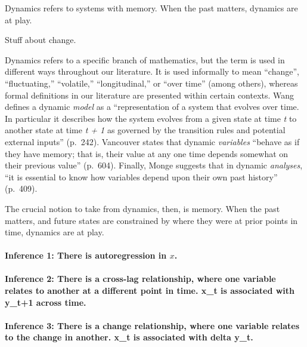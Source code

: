 \documentclass[english,,man]{apa6}
\let\oldparagraph\paragraph
\renewcommand{\paragraph}[1]{\oldparagraph{#1}\mbox{}}
\theoremstyle{definition}
\theoremstyle{definition}
\theoremstyle{definition}
\theoremstyle{remark}
\begin{document}
Dynamics refers to systems with memory. When the past matters, dynamics
are at play.

Stuff about change.

Dynamics refers to a specific branch of mathematics, but the term is
used in different ways throughout our literature. It is used informally
to mean \enquote{change}, \enquote{fluctuating,} \enquote{volatile,}
\enquote{longitudinal,} or \enquote{over time} (among others), whereas
formal definitions in our literature are presented within certain
contexts. Wang defines a dynamic \emph{model} as a
\enquote{representation of a system that evolves over time. In
particular it describes how the system evolves from a given state at
time \emph{t} to another state at time \emph{t + 1} as governed by the
transition rules and potential external inputs} (p.~242). Vancouver
states that dynamic \emph{variables} \enquote{behave as if they have
memory; that is, their value at any one time depends somewhat on their
previous value} (p.~604). Finally, Monge suggests that in dynamic
\emph{analyses}, \enquote{it is essential to know how variables depend
upon their own past history} (p.~409).

The crucial notion to take from dynamics, then, is memory. When the past
matters, and future states are constrained by where they were at prior
points in time, dynamics are at play.

\hypertarget{inference-1-there-is-autoregression-in-x.}{%
\paragraph{\texorpdfstring{Inference 1: There is autoregression in
\(x\).}{Inference 1: There is autoregression in x.}}\label{inference-1-there-is-autoregression-in-x.}}

\hypertarget{inference-2-there-is-a-cross-lag-relationship-where-one-variable-relates-to-another-at-a-different-point-in-time.-x_t-is-associated-with-y_t1-across-time.}{%
\paragraph{Inference 2: There is a cross-lag relationship, where one
variable relates to another at a different point in time. x\_t is
associated with y\_t+1 across
time.}\label{inference-2-there-is-a-cross-lag-relationship-where-one-variable-relates-to-another-at-a-different-point-in-time.-x_t-is-associated-with-y_t1-across-time.}}

\hypertarget{inference-3-there-is-a-change-relationship-where-one-variable-relates-to-the-change-in-another.-x_t-is-associated-with-delta-y_t.}{%
\paragraph{Inference 3: There is a change relationship, where one
variable relates to the change in another. x\_t is associated with delta
y\_t.}\label{inference-3-there-is-a-change-relationship-where-one-variable-relates-to-the-change-in-another.-x_t-is-associated-with-delta-y_t.}}
\end{document}
